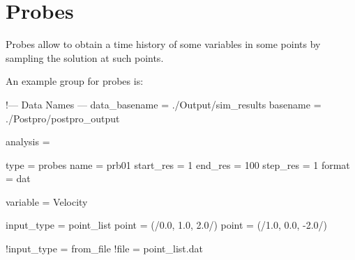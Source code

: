 \section{Probes}

Probes allow to obtain a time history of some variables in some points by 
sampling the solution at such points. 

An example  group for probes is:

\begin{inputfile}[frame=single, caption={dust\_post.in for probes}, 
  label={file:dust_post.in_probes}]
!--- Data Names ---
data_basename = ./Output/sim_results
basename =     ./Postpro/postpro_output

analysis = {

type = probes
name = prb01
start_res = 1
end_res   = 100 
step_res  = 1
format = dat

variable = Velocity

input_type = point_list
point = (/0.0, 1.0, 2.0/)
point = (/1.0, 0.0, -2.0/)

!input_type = from_file
!file = point_list.dat

}
\end{inputfile}

